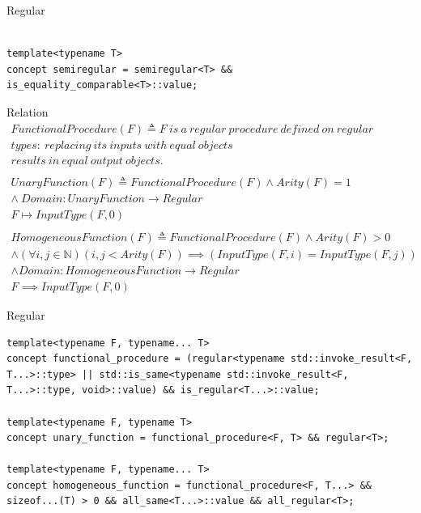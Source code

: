 \documentclass[10pt]{beamer}
\begin{document}
\begin{frame}[fragile]{Regular}
\begin{lstlisting}[style=cpp]

template<typename T>
concept semiregular = semiregular<T> && is_equality_comparable<T>::value;

\end{lstlisting}
\end{frame}

\begin{frame}{Relation}
    \begin{align*}
        FunctionalProcedure(F) \triangleq F~is~a~regular~procedure~defined~on~regular~&\\
        types:~replacing~its~inputs~with~equal~objects~\\
        results~in~equal~output~objects. \\\\
        UnaryFunction(F) \triangleq FunctionalProcedure(F) \land Arity(F) = 1 &\\
                \land~Domain: UnaryFunction \rightarrow Regular &\\
                F \mapsto InputType(F, 0)\\\\
        HomogeneousFunction(F) \triangleq FunctionalProcedure(F) \land Arity(F) > 0\\
        \land (\forall i,j \in \mathbb{N})(i,j < Arity(F)) \implies (InputType(F, i) = InputType(F, j))\\
        \land Domain: HomogeneousFunction \rightarrow Regular\\
        F \implies InputType(F, 0)
    \end{align*}
\end{frame}



\begin{frame}[fragile]{Regular}
\begin{lstlisting}[style=cpp]
template<typename F, typename... T>
concept functional_procedure = (regular<typename std::invoke_result<F, T...>::type> || std::is_same<typename std::invoke_result<F, T...>::type, void>::value) && is_regular<T...>::value;

template<typename F, typename T>
concept unary_function = functional_procedure<F, T> && regular<T>;

template<typename F, typename... T>
concept homogeneous_function = functional_procedure<F, T...> && sizeof...(T) > 0 && all_same<T...>::value && all_regular<T>;

\end{lstlisting}
\end{frame}
\end{document}
